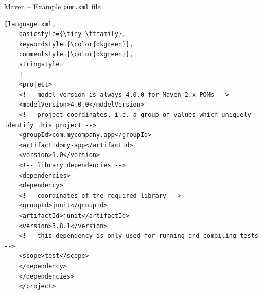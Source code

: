 \documentclass[English,c,%
hyperref={%
    pdftitle={FISA-DE2 OOP in Java},%
    pdfauthor={Muller, Gravier, Laforest, Subercaze},%
    pdfsubject={OOP in Java},%
    pdfkeywords={OOP, Java},%
    colorlinks=true,%
    urlcolor=blue,%
    linkcolor=%
    },%
xcolor={pdftex,svgnames} %
]{beamer}
\begin{document}
\begin{frame}[fragile]{Maven -- Example \texttt{pom.xml} file}

  \begin{lstlisting}[language=xml,
    basicstyle={\tiny \ttfamily},
    keywordstyle={\color{dkgreen}},
    commentstyle={\color{dkgreen}},
    stringstyle=
    ]
    <project>
    <!-- model version is always 4.0.0 for Maven 2.x POMs -->
    <modelVersion>4.0.0</modelVersion>
    <!-- project coordinates, i.e. a group of values which uniquely identify this project -->
    <groupId>com.mycompany.app</groupId>
    <artifactId>my-app</artifactId>
    <version>1.0</version>
    <!-- library dependencies -->
    <dependencies>
    <dependency>
    <!-- coordinates of the required library -->
    <groupId>junit</groupId>
    <artifactId>junit</artifactId>
    <version>3.8.1</version>
    <!-- this dependency is only used for running and compiling tests -->
    <scope>test</scope>
    </dependency>
    </dependencies>
    </project>
  \end{lstlisting}

\end{frame}
\end{document}
